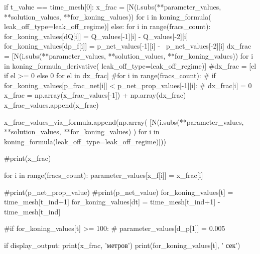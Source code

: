 \begin{pythoncode}
    if t_value == time_mesh[0]:
        x_frac = [N(i.subs({**parameter_values, **solution_values,
                            **for_koning_values}))
                            for i in koning_formula(
                                leak_off_type=leak_off_regime)]
    else:
        for i in range(fracs_count):
            for_koning_values[dQ[i]] = Q_values[-1][i] - Q_values[-2][i]
            for_koning_values[dp_f[i]] = p_net_values[-1][i] - \
                p_net_values[-2][i]
        dx_frac = [N(i.subs({**parameter_values, **solution_values,
                             **for_koning_values}))
                             for i in koning_formula_derivative(
                                 leak_off_type=leak_off_regime)]
        #dx_frac = [el if el >= 0 else 0 for el in dx_frac]
        #for i in range(fracs_count):
        #    if for_koning_values[p_frac_net[i]] < p_net_prop_values[-1][i]:
        #        dx_frac[i] = 0
        x_frac = np.array(x_frac_values[-1]) + np.array(dx_frac)
    x_frac_values.append(x_frac)

    x_frac_values_via_formula.append(np.array(
        [N(i.subs({**parameter_values,
                   **solution_values,
                   **for_koning_values})
           ) for i in koning_formula(leak_off_type=leak_off_regime)]))

    #print(x_frac)

    for i in range(fracs_count):
        parameter_values[x_f[i]] = x_frac[i]
    
    #print(p_net_prop_value)
    #print(p_net_value)
    for_koning_values[t] = time_mesh[t_ind+1]
    for_koning_values[dt] = time_mesh[t_ind+1] - time_mesh[t_ind]
    

    #if for_koning_values[t] >= 100:
    #    parameter_values[d_p[1]] = 0.005

    if display_output:
        print(x_frac, 'метров')
        print(for_koning_values[t], ' сек')
\end{pythoncode}


